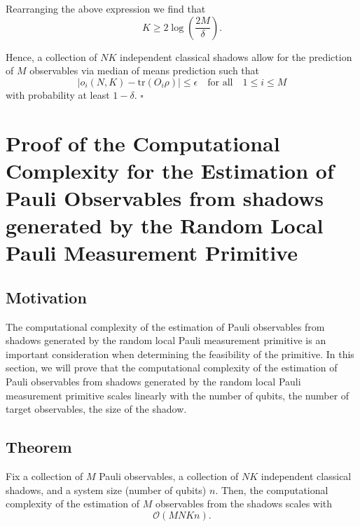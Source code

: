 \documentclass[12pt]{article}
\begin{document}
    Rearranging the above expression we find that
    \begin{equation*}
        K \geq 2\log{\left(\frac{2M}{\delta}\right)}.
    \end{equation*}

    Hence, a collection of $NK$ independent classical shadows allow for the prediction of $M$ observables via median of means prediction such that
    \begin{equation*}
        |\hat{o}_i(N,K) - \text{tr}(O_i\rho)| \leq \epsilon \quad \text{for all} \quad 1 \leq i \leq M
    \end{equation*}
    with probability at least $1-\delta$.
    \hfill $\square$

    \section{Proof of the Computational Complexity for the Estimation of Pauli Observables from shadows generated by the Random Local Pauli Measurement Primitive}
    \subsection{Motivation}
    The computational complexity of the estimation of Pauli observables from shadows generated by the random local Pauli measurement primitive is an important consideration when determining the feasibility of the primitive. In this section, we will prove that the computational complexity of the estimation of Pauli observables from shadows generated by the random local Pauli measurement primitive scales linearly with the number of qubits, the number of target observables, the size of the shadow.

    \subsection{Theorem}
    Fix a collection of $M$ Pauli observables, a collection of $NK$ independent classical shadows, and a system size (number of qubits) $n$. Then, the computational complexity of the estimation of $M$ observables from the shadows scales with
    \begin{equation*}
        \mathcal{O}\left(MNKn\right).
    \end{equation*}
\end{document}
